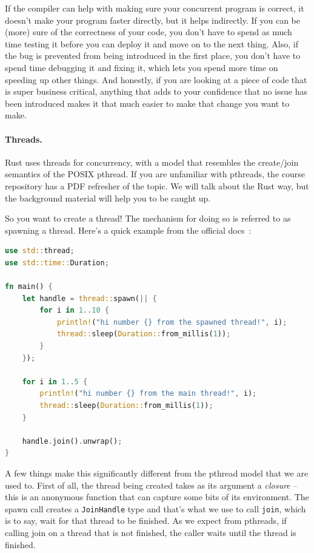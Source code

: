\documentclass[a4paper]{report}
\begin{document}
If the compiler can help with making sure your concurrent program is correct, it doesn't make your program faster directly, but it helps indirectly. If you can be (more) sure of the correctness of your code, you don't have to spend as much time testing it before you can deploy it and move on to the next thing. Also, if the bug is prevented from being introduced in the first place, you don't have to spend time debugging it and fixing it, which lets you spend more time on speeding up other things. And honestly, if you are looking at a piece of code that is super business critical, anything that adds to your confidence that no issue has been introduced makes it that much easier to make that change you want to make.

\paragraph{Threads.} Rust uses threads for concurrency, with a model that resembles the create/join semantics of the POSIX pthread. If you are unfamiliar with pthreads, the course repository has a PDF refresher of the topic. We will talk about the Rust way, but the background material will help you to be caught up.

So you want to create a thread! The mechanism for doing so is referred to as spawning a thread. Here's a quick example from the official docs~\cite{rustdocs}:

\begin{lstlisting}[language=Rust]
use std::thread;
use std::time::Duration;

fn main() {
    let handle = thread::spawn(|| {
        for i in 1..10 {
            println!("hi number {} from the spawned thread!", i);
            thread::sleep(Duration::from_millis(1));
        }
    });

    for i in 1..5 {
        println!("hi number {} from the main thread!", i);
        thread::sleep(Duration::from_millis(1));
    }

    handle.join().unwrap();
}
\end{lstlisting}

A few things make this significantly different from the pthread model that we are used to. First of all, the thread being created takes as its argument a \textit{closure} -- this is an anonymous function that can capture some bits of its environment. The spawn call creates a \texttt{JoinHandle} type and that's what we use to call \texttt{join}, which is to say, wait for that thread to be finished. As we expect from pthreads, if calling join on a thread that is not finished, the caller waits until the thread is finished.
\end{document}
